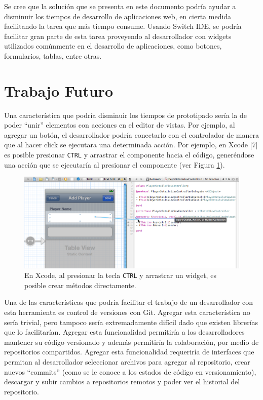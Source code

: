 \documentclass[12pt,spanish,letter]{report}
\makeatletter
\def\maxwidth{\ifdim\Gin@nat@width>\linewidth\linewidth
\else\Gin@nat@width\fi}
\let\Oldincludegraphics\includegraphics
\renewcommand{\includegraphics}[1]{\Oldincludegraphics[width=\maxwidth]{#1}}
\makeatother
\begin{document}
Se cree que la solución que se presenta en este documento podría ayudar
a disminuir los tiempos de desarrollo de aplicaciones web, en cierta
medida facilitando la tarea que más tiempo consume. Usando Switch IDE,
se podría facilitar gran parte de esta tarea proveyendo al desarrollador
con widgets utilizados comúnmente en el desarrollo de aplicaciones, como
botones, formularios, tablas, entre otras.

\section{Trabajo Futuro}

\label{section:future-work}

Una característica que podría disminuir los tiempos de prototipado sería
la de poder ``unir'' elementos con acciones en el editor de vistas. Por
ejemplo, al agregar un botón, el desarrollador podría conectarlo con el
controlador de manera que al hacer click se ejecutara una determinada
acción. Por ejemplo, en Xcode {[}7{]} es posible presionar \texttt{CTRL}
y arrastrar el componente hacia el código, generéndose una acción que se
ejecutaría al presionar el componente (ver Figura
\ref{figure:xcode-ctrl-drag}).

\begin{figure}[htbp]
\centering
\includegraphics{figures/xcode-ctrl-drag.png}
\caption{En Xcode, al presionar la tecla \texttt{CTRL} y arrastrar un
widget, es posible crear métodos directamente.
\label{figure:xcode-ctrl-drag}}
\end{figure}

Una de las características que podría facilitar el trabajo de un
desarrollador con esta herramienta es control de versiones con Git.
Agregar esta característica no sería trivial, pero tampoco sería
extremadamente difícil dado que existen librerías que lo facilitarían.
Agregar esta funcionalidad permitiría a los desarrolladores mantener su
código versionado y además permitiría la colaboración, por medio de
repositorios compartidos. Agregar esta funcionalidad requeriría de
interfaces que permitan al desarrollador seleccionar archivos para
agregar al repositorio, crear nuevos ``commits'' (como se le conoce a
los estados de código en versionamiento), descargar y subir cambios a
repositorios remotos y poder ver el historial del repositorio.
\end{document}
